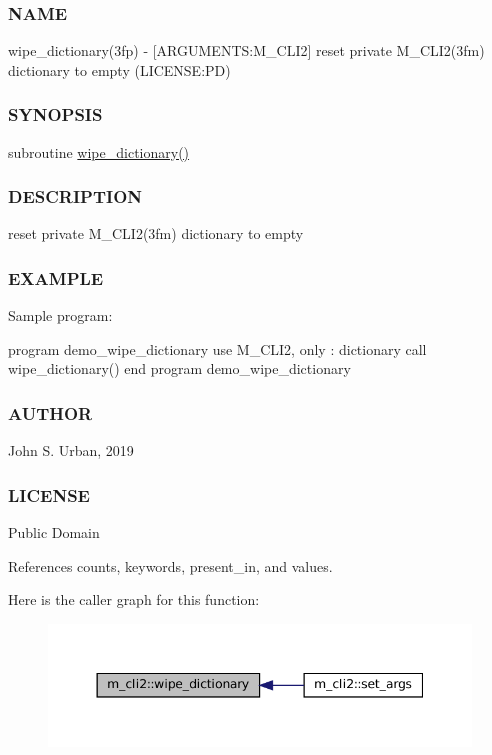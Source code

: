 \subsubsection*{N\+A\+ME}

wipe\+\_\+dictionary(3fp) -\/ \mbox{[}A\+R\+G\+U\+M\+E\+N\+TS\+:M\+\_\+\+C\+L\+I2\mbox{]} reset private M\+\_\+\+C\+L\+I2(3fm) dictionary to empty (L\+I\+C\+E\+N\+SE\+:PD) \subsubsection*{S\+Y\+N\+O\+P\+S\+IS}

subroutine \mbox{\hyperlink{namespacem__cli2_ab1525b0419475486f520ef502daa5e94}{wipe\+\_\+dictionary()}} \subsubsection*{D\+E\+S\+C\+R\+I\+P\+T\+I\+ON}

reset private M\+\_\+\+C\+L\+I2(3fm) dictionary to empty \subsubsection*{E\+X\+A\+M\+P\+LE}

Sample program\+: \begin{DoxyVerb} program demo_wipe_dictionary
 use M_CLI2, only : dictionary
    call wipe_dictionary()
 end program demo_wipe_dictionary
\end{DoxyVerb}
 \subsubsection*{A\+U\+T\+H\+OR}

John S. Urban, 2019 \subsubsection*{L\+I\+C\+E\+N\+SE}

Public Domain 

References counts, keywords, present\+\_\+in, and values.

Here is the caller graph for this function\+:\nopagebreak
\begin{figure}[H]
\begin{center}
\leavevmode
\includegraphics[width=344pt]{namespacem__cli2_ab1525b0419475486f520ef502daa5e94_icgraph}
\end{center}
\end{figure}



